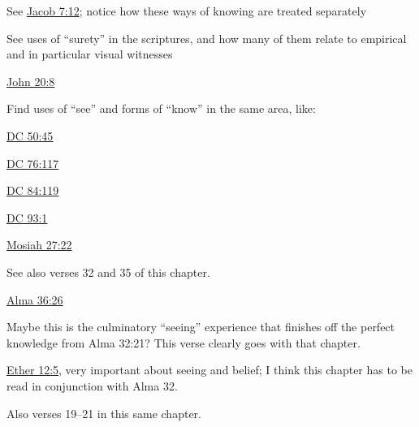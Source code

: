 			\begin{compactitem}
				\item See \hyperref[JACOB-7-12]{Jacob 7:12}; notice how these ways of knowing are treated separately
				\item See uses of ``surety'' in the scriptures, and how many of them relate to empirical and in particular visual witnesses
				\item \hyperref[JOHN-20-8]{John 20:8}
				\item Find uses of ``see'' and forms of ``know'' in the same area, like:
					\begin{compactitem}
						\item \hyperref[DC50-45]{DC 50:45}
						\item \hyperref[DC76-117]{DC 76:117}
						\item \hyperref[DC84-119]{DC 84:119}
						\item \hyperref[DC93-1]{DC 93:1}
					\end{compactitem}
				\item \hyperref[MOSIAH-27-22]{Mosiah 27:22} 
					\begin{compactitem}
						\item See also verses 32 and 35 of this chapter.
					\end{compactitem}
				\item \hyperref[ALMA-36-26]{Alma 36:26}
					\begin{compactitem}
						\item Maybe this is the culminatory ``seeing'' experience that finishes off the perfect knowledge from Alma 32:21? This verse clearly goes with that chapter.
					\end{compactitem}
				\item \hyperref[ETHER-12-5]{Ether 12:5}, very important about seeing and belief; I think this chapter has to be read in conjunction with Alma 32.
					\begin{compactitem}
						\item Also verses 19--21 in this same chapter.
					\end{compactitem}
			\end{compactitem}
			